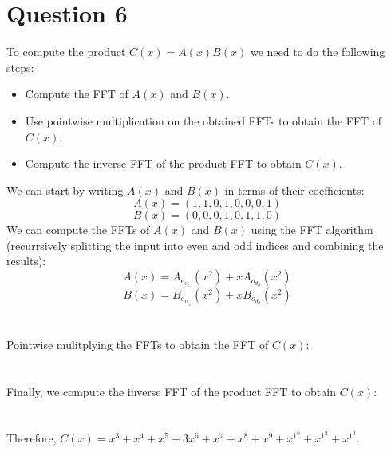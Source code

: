 \documentclass{article}
\begin{document}
\section{Question 6}
To compute the product $C(x) = A(x)B(x)$ we need to do the following steps:
\begin{itemize}
    \item Compute the FFT of $A(x)$ and $B(x)$.
    \item Use pointwise multiplication on the obtained FFTs to obtain the FFT of $C(x)$.
    \item Compute the inverse FFT of the product FFT to obtain $C(x)$.
\end{itemize}
We can start by writing $A(x)$ and $B(x)$ in terms of their coefficients:
$$A(x) = (1, 1, 0, 1, 0, 0, 0, 1)$$
$$B(x) = (0, 0, 0, 1, 0, 1, 1, 0)$$
We can compute the FFTs of $A(x)$ and $B(x)$ using the FFT algorithm (recurrsively splitting the input into even and odd indices and combining the results):\\
$$A(x) = A_e_v_e_n(x^2) + xA_o_d_d(x^2)$$
$$B(x) = B_e_v_e_n(x^2) + xB_o_d_d(x^2)$$
\\\\
Pointwise mulitplying the FFTs to obtain the FFT of $C(x)$:\\\\\\
Finally, we compute the inverse FFT of the product FFT to obtain $C(x)$:\\\\\\
Therefore, $C(x) = x^3 + x^4 + x^5 + 3x^6 + x^7 + x^8 + x^9 + x^1^0 + x^1^2+x^1^3$.\\\\
\end{document}
